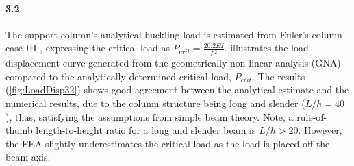 \paragraph{3.2} The support column's analytical buckling load is estimated from Euler's column case III \cite{Styrkebog}, expressing the critical load as $P_{crit} = \frac{20.2EI}{L^2}$.  illustrates the load-displacement curve generated from the geometrically non-linear analysis (GNA) compared to the analytically determined critical load, $P_{crit}$. The results (\cref{fig:LoadDisp32}) shows good agreement between the analytical estimate and the numerical results, due to the column structure being long and slender  ($L/h=40$), thus, satisfying the assumptions from simple beam theory. Note, a rule-of-thumb length-to-height ratio for a long and slender beam is $L/h>20$. However, the FEA slightly underestimates the critical load as the load is placed off the beam axis.
\squeezeup
